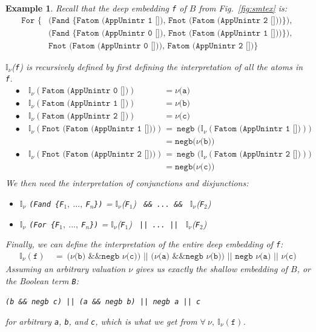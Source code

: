 \documentclass{article}
\newtheorem{example}{Example}[section]
\newcommand{\avar}{Fatom (AppUnintr 0 [])}
\newcommand{\bvar}{Fatom (AppUnintr 1 [])}
\newcommand{\cvar}{Fatom (AppUnintr 2 [])}
\newcommand{\fnot}[1]{Fnot (#1)}
\newcommand{\intr}[1]{\mathbb{I}_{\nu}(#1)}
\begin{document}
	\begin{example}
		\em Recall that the deep embedding
		\texttt{f} of $B$ from 
		Fig.~\ref{fig:smtex} is:
		\begin{align*}
			\texttt{For \{}
			&\texttt{(Fand \{\bvar,\ 
				\fnot{\cvar}\}), }\\
			&\texttt{(Fand \{\avar,\ 
				\fnot{\bvar}\}), }\\
			&\texttt{\fnot \avar, 
				\cvar\}}  
		\end{align*}

		$\mathbb{I}_{\nu}$(\texttt{f}) 
		is recursively defined
		by first defining the interpretation
		of all the atoms in \texttt{f}.
		\begin{align*}
			&\bullet\quad \intr{\texttt{\avar}} 
			&= \texttt{$\nu$(a)}\\
			&\bullet\quad \intr{\texttt{\bvar}} 
			&= \texttt{$\nu$(b)}\\
			&\bullet\quad \intr{\texttt{\cvar}} 
			&= \texttt{$\nu$(c)}\\
			&\bullet\quad \intr{\texttt{\fnot{\bvar}}} &= \ 
			\texttt{negb (}\intr{\texttt{\bvar}}\texttt{)}\\
			& &= \texttt{negb(}\nu
			\texttt{(b))}\\
			&\bullet\quad \intr{\texttt{\fnot{\cvar}}} &= \ 
			\texttt{negb (}\intr{\texttt{\cvar}}\texttt{)}\\
			& &= \texttt{negb(}\nu
			\texttt{(c))}\\
		\end{align*}
		We then need the interpretation of 
		conjunctions and disjunctions:
		\begin{itemize}
			\item$\mathbb{I}_{\nu}$
			\texttt{(Fand \{F$_1,\ ...,\ $F$_n$\})} = 
			$\mathbb{I}_{\nu}$(\texttt{F$_1$})
			\texttt{ \&\& ... \&\& }
			$\mathbb{I}_{\nu}$(\texttt{F$_2$})
			\item$\mathbb{I}_{\nu}$
			\texttt{(For \{F$_1,\ ...,\ $F$_n$\})} = 
			$\mathbb{I}_{\nu}$(\texttt{F$_1$})
			\texttt{ || ... || }
			$\mathbb{I}_{\nu}$(\texttt{F$_2$})
		\end{itemize}
		Finally, we can define the interpretation 
		of the entire deep embedding of \texttt{f}:
		\begin{align*}
			\intr{\texttt{f}}\ &=\ 
			\texttt{($\nu$(b) \&\& negb $\nu$(c)) ||
					($\nu$(a) \&\& negb $\nu$(b)) ||
					negb $\nu$(a) ||
					$\nu$(c)}
		\end{align*}
		Assuming an arbitrary valuation 
		$\nu$ gives us exactly the shallow 
		embedding of $B$, or the Boolean
		term \texttt{B}:
		\begin{center}
			\texttt{(b \&\& negb c) || (a 
				\&\& negb b) || negb a || c}
		\end{center}
		for arbitrary \texttt{a}, \texttt{b},
		and \texttt{c}, which is what we 
		get from 
		$\forall\ \nu,\ \intr{\texttt{f}}$.
		

\end{example}
\end{document}
